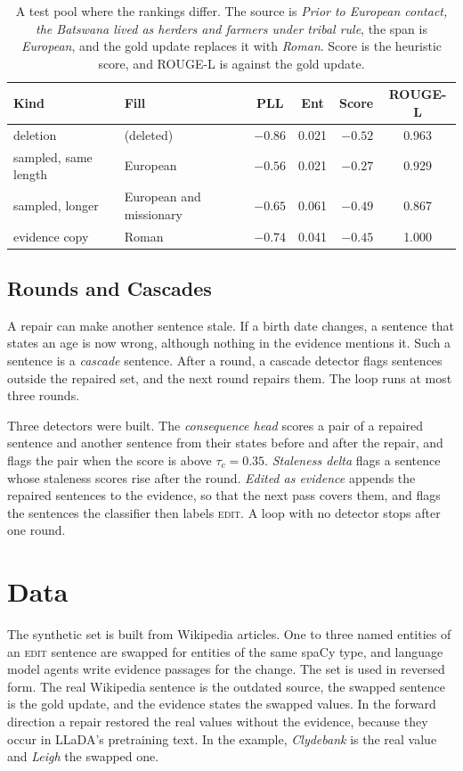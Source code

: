 \documentclass[]{paper}
\newcommand{\edit}{\textsc{edit}}
\begin{document}
\begin{table}[H]
\caption{A test pool where the rankings differ. The source is \emph{Prior to European contact, the Batswana lived as herders and farmers under tribal rule}, the span is \emph{European}, and the gold update replaces it with \emph{Roman}. Score is the heuristic score, and ROUGE-L is against the gold update.}
\label{tab:learned}
\centering
\footnotesize
\begin{tabular}{llccrc}
\toprule
Kind & Fill & PLL & Ent & Score & ROUGE-L \\
\midrule
deletion & (deleted) & $-0.86$ & 0.021 & $-0.52$ & 0.963 \\
sampled, same length & European & $-0.56$ & 0.021 & $-0.27$ & 0.929 \\
sampled, longer & European and missionary & $-0.65$ & 0.061 & $-0.49$ & 0.867 \\
evidence copy & Roman & $-0.74$ & 0.041 & $-0.45$ & 1.000 \\
\bottomrule
\end{tabular}
\end{table}

\subsection{Rounds and Cascades}

A repair can make another sentence stale. If a birth date changes, a sentence that states an age is now wrong, although nothing in the evidence mentions it. Such a sentence is a \emph{cascade} sentence. After a round, a cascade detector flags sentences outside the repaired set, and the next round repairs them. The loop runs at most three rounds.

Three detectors were built. The \emph{consequence head} scores a pair of a repaired sentence and another sentence from their states before and after the repair, and flags the pair when the score is above $\tau_c = 0.35$. \emph{Staleness delta} flags a sentence whose staleness scores rise after the round. \emph{Edited as evidence} appends the repaired sentences to the evidence, so that the next pass covers them, and flags the sentences the classifier then labels \edit{}. A loop with no detector stops after one round.

\section{Data}
\label{sec:data}

The synthetic set is built from Wikipedia articles. One to three named entities of an \edit{} sentence are swapped for entities of the same spaCy type, and language model agents write evidence passages for the change. The set is used in reversed form. The real Wikipedia sentence is the outdated source, the swapped sentence is the gold update, and the evidence states the swapped values. In the forward direction a repair restored the real values without the evidence, because they occur in LLaDA's pretraining text. In the example, \emph{Clydebank} is the real value and \emph{Leigh} the swapped one.
\end{document}

